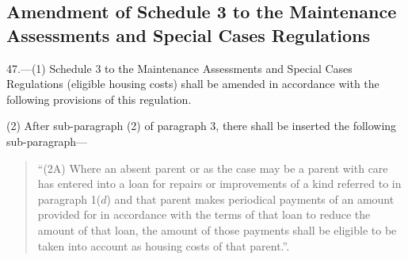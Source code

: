 \documentclass[12pt,a4paper]{article}
\begin{document}
\subsection[47. Amendment of Schedule 3 to the Maintenance Assessments and Special Cases Regulations]{Amendment of Schedule 3 to the Maintenance Assessments and Special Cases Regulations}

47.—(1) Schedule 3 to the Maintenance Assessments and Special Cases Regulations (eligible housing costs) shall be amended in accordance with the following provisions of this regulation.

(2) After sub-paragraph (2) of paragraph 3, there shall be inserted the following sub-paragraph—
\begin{quotation}
“(2A) Where an absent parent or as the case may be a parent with care has entered into a loan for repairs or improvements of a kind referred to in paragraph 1($d$) and that parent makes periodical payments of an amount provided for in accordance with the terms of that loan to reduce the amount of that loan, the amount of those payments shall be eligible to be taken into account as housing costs of that parent.”.
\end{quotation}
\end{document}
